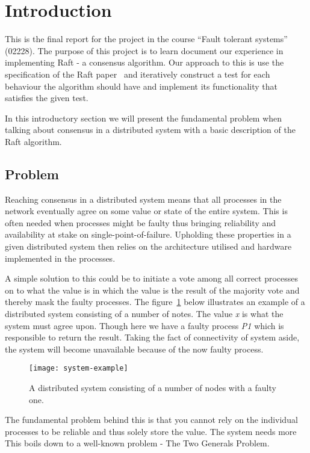 \setcounter{page}{1}

\section{Introduction} %
\label{sec:introduction}

This is the final report for the project in the course ``Fault tolerant systems'' (02228). The purpose of this project is to learn document our experience in implementing Raft - a consensus algorithm. Our approach to this is use the specification of the Raft paper~\cite[p.~4]{Raft} and iteratively construct a test for each behaviour the algorithm should have and implement its functionality that satisfies the given test.

In this introductory section we will present the fundamental problem when talking about consensus in a distributed system with a basic description of the Raft algorithm.

\subsection{Problem}
Reaching consensus in a distributed system means that all processes in the network eventually agree on some value or state of the entire system. This is often needed when processes might be faulty thus bringing reliability and availability at stake on single-point-of-failure. Upholding these properties in a given distributed system then relies on the architecture utilised and hardware implemented in the processes.

A simple solution to this could be to initiate a vote among all correct processes on to what the value is in which the value is the result of the majority vote and thereby mask the faulty processes. The figure~\ref{consensus} below illustrates an example of a distributed system consisting of a number of notes. The value \textit{x} is what the system must agree upon. Though here we have a faulty process \textit{P1} which is responsible to return the result. Taking the fact of connectivity of system aside, the system will become unavailable because of the now faulty process.

\begin{figure}[h]
	\centering
	\texttt{[image: system-example]}
	\caption{A distributed system consisting of a number of nodes with a faulty one.}
	\label{consensus}
\end{figure}

The fundamental problem behind this is that you cannot rely on the individual processes to be reliable and thus solely store the value. The system needs more This boils down to a well-known problem - The Two Generals Problem.

